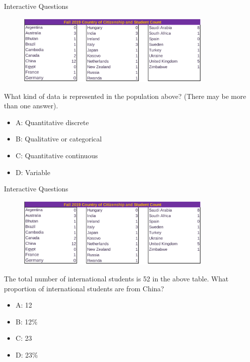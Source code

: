 \documentclass{beamer}
\begin{document}
\begin{frame}{Interactive Questions}
\begin{figure}
\centering
\includegraphics[width=0.85\textwidth]{figures/map.png}
\end{figure}
What kind of data is represented in the population above? (There may be more than one answer).
\begin{itemize}
\item A: Quantitative discrete
\item B: Qualitative or categorical
\item C: Quantitative continuous
\item D: Variable
\end{itemize}
\end{frame}

\begin{frame}{Interactive Questions}
\begin{figure}
\centering
\includegraphics[width=0.85\textwidth]{figures/map.png}
\end{figure}
The total number of international students is 52 in the above table.  What proportion of international students are from China?
\begin{itemize}
\item A: 12
\item B: 12\%
\item C: 23
\item D: 23\%
\end{itemize}
\end{frame}
\end{document}
